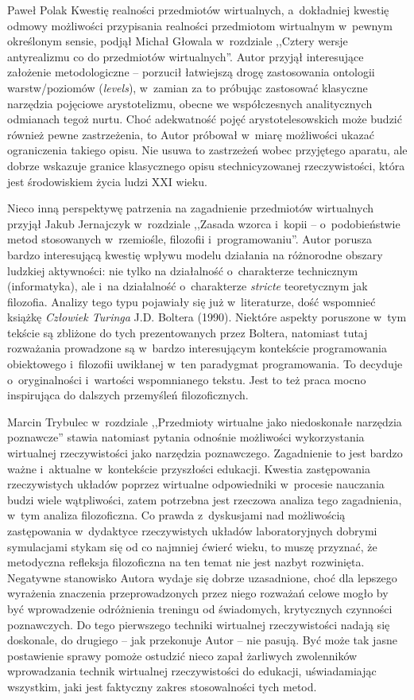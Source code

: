 \begin{recplenv}{Paweł Polak}
Kwestię realności przedmiotów wirtualnych, a~dokładniej kwestię odmowy możliwości przypisania realności przedmiotom wirtualnym w~pewnym określonym sensie, podjął Michał Głowala w~rozdziale ,,Cztery wersje antyrealizmu co do przedmiotów wirtualnych''. Autor przyjął interesujące założenie metodologiczne -- porzucił łatwiejszą drogę zastosowania ontologii warstw/poziomów (\textit{levels}), w~zamian za to próbując zastosować klasyczne narzędzia pojęciowe arystotelizmu, obecne we współczesnych analitycznych odmianach tegoż nurtu. Choć adekwatność pojęć arystotelesowskich może budzić również pewne zastrzeżenia, to Autor próbował w~miarę możliwości ukazać ograniczenia takiego opisu. Nie usuwa to zastrzeżeń wobec przyjętego aparatu, ale dobrze wskazuje granice klasycznego opisu stechnicyzowanej rzeczywistości, która jest środowiskiem życia ludzi XXI wieku.

Nieco inną perspektywę patrzenia na zagadnienie przedmiotów wirtualnych przyjął Jakub Jernajczyk w~rozdziale ,,Zasada wzorca i~kopii -- o~podobieństwie metod stosowanych w~rzemiośle, filozofii i~programowaniu''. Autor porusza bardzo interesującą kwestię wpływu modelu działania na różnorodne obszary ludzkiej aktywności: nie tylko na działalność o~charakterze technicznym (informatyka), ale i~na działalność o~charakterze \textit{stricte} teoretycznym jak filozofia. Analizy tego typu pojawiały się już w~literaturze, dość wspomnieć książkę \textit{Człowiek Turinga} J.D. Boltera (1990). Niektóre aspekty poruszone w~tym tekście są zbliżone do tych prezentowanych przez Boltera, natomiast tutaj rozważania prowadzone są w~bardzo interesującym kontekście programowania obiektowego i~filozofii uwikłanej w~ten paradygmat programowania. To decyduje o~oryginalności i~wartości wspomnianego tekstu. Jest to też praca mocno inspirująca do dalszych przemyśleń filozoficznych.

Marcin Trybulec w~rozdziale ,,Przedmioty wirtualne jako niedoskonałe narzędzia poznawcze'' stawia natomiast pytania odnośnie możliwości wykorzystania wirtualnej rzeczywistości jako narzędzia poznawczego. Zagadnienie to jest bardzo ważne i~aktualne w~kontekście przyszłości edukacji. Kwestia zastępowania rzeczywistych układów poprzez wirtualne odpowiedniki w~procesie nauczania budzi wiele wątpliwości, zatem potrzebna jest rzeczowa analiza tego zagadnienia, w~tym analiza filozoficzna. Co prawda z~dyskusjami nad możliwością zastępowania w~dydaktyce rzeczywistych układów laboratoryjnych dobrymi symulacjami stykam się od co najmniej ćwierć wieku, to muszę przyznać, że metodyczna refleksja filozoficzna na ten temat nie jest nazbyt rozwinięta. Negatywne stanowisko Autora wydaje się dobrze uzasadnione, choć dla lepszego wyrażenia znaczenia przeprowadzonych przez niego rozważań celowe mogło by być wprowadzenie odróżnienia treningu od świadomych, krytycznych czynności poznawczych. Do tego pierwszego techniki wirtualnej rzeczywistości nadają się doskonale, do drugiego -- jak przekonuje Autor -- nie pasują. Być może tak jasne postawienie sprawy pomoże ostudzić nieco zapał żarliwych zwolenników wprowadzania technik wirtualnej rzeczywistości do edukacji, uświadamiając wszystkim, jaki jest faktyczny zakres stosowalności tych metod.


\end{recplenv}
